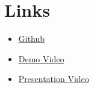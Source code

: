 \documentclass[conference]{IEEEtran}
\begin{document}

\section{Links}

\begin{itemize}
    \item \href{https://github.com/aambroo/Computer-Vision-Final-Assignment}{Github}
    \item \href{https://github.com/aambroo/Computer-Vision-Final-Assignment/tree/main/outputs}{Demo Video}
    \item \href{https://drive.google.com/file/d/1fRD-JyYXOSUcOdc-wXBpLXVveVpILnZu/view?usp=sharing}{Presentation Video}
\end{itemize}



\end{document}
